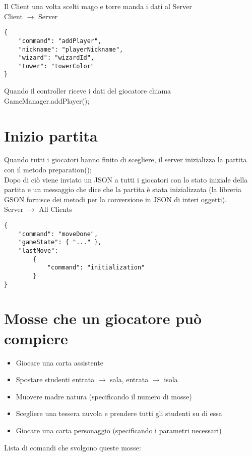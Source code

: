 \documentclass{article}
\begin{document}
\noindent Il Client una volta scelti mago e torre manda i dati al Server\\

\noindent Client $\rightarrow$ Server

\begin{verbatim}
{
	"command": "addPlayer",
	"nickname": "playerNickname",
	"wizard": "wizardId",
	"tower": "towerColor"
}
\end{verbatim}

\bigskip
\noindent Quando il controller riceve i dati del giocatore chiama GameManager.addPlayer();


\bigskip
\section{Inizio partita}

Quando tutti i giocatori hanno finito di scegliere, il server inizializza la partita con il metodo preparation();\\
Dopo di ciò viene inviato un JSON a tutti i giocatori con lo stato iniziale della partita e un messaggio che dice che la partita è stata inizializzata (la libreria GSON fornisce dei metodi per la conversione in JSON di interi oggetti).\\

\noindent Server $\rightarrow$ All Clients
\begin{verbatim}
{
	"command": "moveDone",
	"gameState": { "..." },
	"lastMove":
	    {
	        "command": "initialization"
	    }
}
\end{verbatim}

\bigskip
\section{Mosse che un giocatore può compiere}

\begin{itemize}
\item Giocare una carta assistente
\item Spostare studenti entrata $\rightarrow$ sala, entrata $\rightarrow$ isola
\item Muovere madre natura (specificando il numero di mosse)
\item Scegliere una tessera nuvola e prendere tutti gli studenti su di essa
\item Giocare una carta personaggio (specificando i parametri necessari)
\end{itemize}

\bigskip
\noindent Lista di comandi che svolgono queste mosse:
\end{document}
